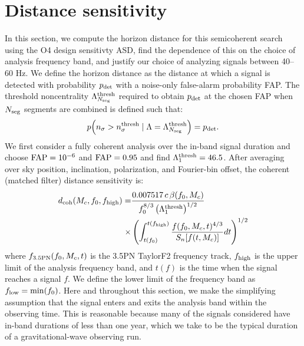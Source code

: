\documentclass[aps,prd,amsmath,floats,floatfix, twocolumn,
superscriptaddress,nofootinbib,showpacs]{revtex4-2}
\begin{document}
\section{Distance sensitivity}
\label{sec:distance_sens}
In this section, we compute the horizon distance for this semicoherent search using the O4 design sensitivty ASD, find the dependence of this on the choice of analysis frequency band, and justify our choice of analyzing signals between 40--60 Hz. We define the horizon distance as the distance at which a signal is
detected with probability $p_{\rm det}$ with a noise-only
false-alarm probability FAP. The threshold noncentrality $\Lambda_{N_{\rm seg}}^{\rm thresh}$ required to obtain 
$p_{\rm det}$ at the chosen FAP when $N_{\rm seg}$ segments
are combined is defined such that:
\begin{equation}
    p\!\left(
        n_\sigma>n_\sigma^{\rm thresh}
        \mid \Lambda=\Lambda_{N_{\rm seg}}^{\rm thresh}
    \right)
    =p_{\rm det}. 
    \label{eq:noncentrality_threshold}
\end{equation}
We first consider a
fully coherent analysis over the in-band signal duration and choose ${\rm FAP}=10^{-6}$ and ${\rm FAP}=0.95$ and find $\Lambda_1^{\rm thresh}=46.5$. After averaging over sky position,
inclination, polarization, and Fourier-bin offset, the coherent (matched filter) distance
sensitivity is:
\begin{align}
  d_{\rm coh}(M_c,f_0,f_{\rm high}) =& 
  \frac{0.007517 \, c \, \beta(f_0,M_c)}
  {f_0^{8/3} \left(\Lambda_1^{\rm thresh}\right)^{1/2}} \nonumber\\
  \times& \left(\int_{t(f_0)}^{t(f_{\rm high})}
  \frac{f(f_0,M_c, t)^{4/3}}
  {S_n[f(t,M_c)]}dt\right)^{1/2}
\end{align}
where $f_{\rm 3.5 PN}(f_0,M_c, t)$ is the 3.5PN TaylorF2 frequency track, $f_{\rm high}$ is the upper limit of the analysis frequency band, and $t(f)$ is the time when the signal reaches a signal $f$. We define the lower limit of the frequency band as $f_{\rm low}=\min(f_0)$. Here and throughout this section, we make the simplifying assumption that the signal enters and exits the analysis band within the observing time. This is reasonable because many of the signals considered have in-band durations of less than one year, which we take to be the typical duration of a gravitational-wave observing run.
\end{document}

